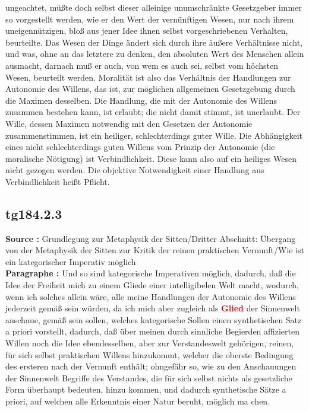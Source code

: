\documentclass[a4paper,12pt,twoside]{book}
\newcommand{\match}[1]{\textcolor{red}{\textbf{#1}}}
\begin{document}
ungeachtet, müßte doch selbst dieser alleinige unumschränkte Gesetzgeber immer so vorgestellt werden, wie er den Wert der vernünftigen Wesen, nur nach ihrem uneigennützigen, bloß aus jener Idee ihnen selbst vorgeschriebenen Verhalten, beurteilte. Das Wesen der Dinge ändert sich durch ihre äußere Verhältnisse nicht, und was, ohne an das letztere zu denken, den absoluten Wert des Menschen allein ausmacht, darnach muß er auch, von wem es auch sei, selbst vom höchsten Wesen, beurteilt werden. Moralität ist also das Verhältnis der Handlungen zur Autonomie des Willens, das ist, zur möglichen allgemeinen Gesetzgebung durch die  Maximen desselben. Die Handlung, die mit der Autonomie des Willens zusammen bestehen kann, ist erlaubt; die nicht damit stimmt, ist unerlaubt. Der Wille, dessen Maximen notwendig mit den Gesetzen der Autonomie zusammenstimmen, ist ein heiliger, schlechterdings guter Wille. Die Abhängigkeit eines nicht schlechterdings guten Willens vom Prinzip der Autonomie (die moralische Nötigung) ist Verbindlichkeit. Diese kann also auf ein heiliges Wesen nicht gezogen werden. Die objektive Notwendigkeit einer Handlung aus Verbindlichkeit heißt Pflicht. 
	
	\subsection*{tg184.2.3} 
	\textbf{Source : }Grundlegung zur Metaphysik der Sitten/Dritter Abschnitt: Übergang von der Metaphysik der Sitten zur Kritik der reinen praktischen Vernunft/Wie ist ein kategorischer Imperativ möglich\\  
	
	\noindent\textbf{Paragraphe : }Und so sind kategorische Imperativen möglich, dadurch, daß die Idee der Freiheit mich zu einem Gliede einer intelligibelen Welt macht, wodurch, wenn ich solches allein wäre, alle meine Handlungen der Autonomie des Willens jederzeit gemäß sein würden, da ich mich aber zugleich als \match{Glied} der Sinnenwelt anschaue, gemäß sein sollen, welches kategorische Sollen einen synthetischen Satz a priori vorstellt, dadurch, daß über meinen durch sinnliche Begierden affizierten Willen noch die Idee ebendesselben, aber zur Verstandeswelt gehörigen, reinen, für sich selbst praktischen Willens hinzukommt, welcher die oberste Bedingung des ersteren nach der Vernunft enthält; ohngefähr so, wie zu den Anschauungen der Sinnenwelt Begriffe des Verstandes, die für sich selbst nichts als gesetzliche Form überhaupt bedeuten, hinzu kommen, und dadurch synthetische Sätze a priori, auf welchen alle Erkenntnis einer Natur beruht, möglich ma chen. 
	
\end{document}
